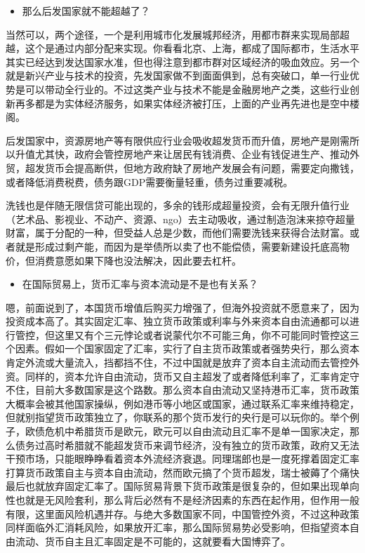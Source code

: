 \documentclass[
  letterpaper,
  DIV=11,
  numbers=noendperiod]{scrreprt}
\providecommand{\tightlist}{%
  \setlength{\itemsep}{0pt}\setlength{\parskip}{0pt}}\usepackage{longtable,booktabs,array}
\begin{document}
\begin{itemize}
\tightlist
\item
  那么后发国家就不能超越了？
\end{itemize}

当然可以，两个途径，一个是利用城市化发展城邦经济，用都市群来实现局部超越，这个是通过内部分配来实现。你看看北京、上海，都成了国际都市，生活水平其实已经达到发达国家水准，但也得注意到都市群对区域经济的吸血效应。另一个就是新兴产业与技术的投资，先发国家做不到面面俱到，总有突破口，单一行业优势是可以带动全行业的。不过这类产业与技术不能是金融房地产之类，这些行业创新再多都是为实体经济服务，如果实体经济被打压，上面的产业再先进也是空中楼阁。

后发国家中，资源房地产等有限供应行业会吸收超发货币而升值，房地产是刚需所以升值尤其快，政府会管控房地产来让居民有钱消费、企业有钱促进生产、推动外贸，超发货币会提高断供，但地方政府缺了房地产发展会有问题，需要定向撒钱，或者降低消费税费，债务跟GDP需要衡量轻重，债务过重要减税。

洗钱也是伴随无限信贷可能出现的，多余的钱形成超量投资，会有无限升值行业（艺术品、影视业、不动产、资源、ngo）去主动吸收，通过制造泡沫来掠夺超量财富，属于分配的一种，但受益人总是少数，而他们需要洗钱来获得合法财富。或者就是形成过剩产能，而因为是举债所以卖了也不能偿债，需要新建设托底高物价，但消费意愿如果下降也没法解决，因此要去杠杆。

\begin{itemize}
\tightlist
\item
  在国际贸易上，货币汇率与资本流动是不是也有关系？
\end{itemize}

嗯，前面说到了，本国货币增值后购买力增强了，但海外投资就不愿意来了，因为投资成本高了。其实固定汇率、独立货币政策或利率与外来资本自由流通都可以进行管控，但这里又有个三元悖论或者说蒙代尔不可能三角，你不可能同时管控这三个因素。假如一个国家固定了汇率，实行了自主货币政策或者强势央行，那么资本肯定外流或大量流入，挡都挡不住，不过中国就是放弃了资本自主流动而去管控外资。同样的，资本允许自由流动，货币又自主超发了或者降低利率了，汇率肯定守不住，目前大多数国家是这个路数。那么资本自由流动又坚持港币汇率，货币政策大概率会被其他国家操纵，例如港币等小地区或国家，通过联系汇率来维持稳定，但就别指望货币政策独立了，你联系的那个货币发行的央行是可以玩你的。举个例子，欧债危机中希腊货币是欧元，欧元可以自由流动且汇率不是单一国家决定，那么债务过高时希腊就不能超发货币来调节经济，没有独立的货币政策，政府又无法干预市场，只能眼睁睁看着资本外流经济衰退。同理瑞郎也是一度死撑着固定汇率打算货币政策自主与资本自由流动，然而欧元搞了个货币超发，瑞士被薅了个痛快最后也就放弃固定汇率了。国际贸易背景下货币政策是很复杂的，但如果出现单向性也就是无风险套利，那么背后必然有不是经济因素的东西在起作用，但作用一般有限，这里面风险机遇并存。与绝大多数国家不同，中国管控外资，不过这种政策同样面临外汇消耗风险，如果放开汇率，那么国际贸易势必受影响，但指望资本自由流动、货币自主且汇率固定是不可能的，这就要看大国博弈了。
\end{document}
